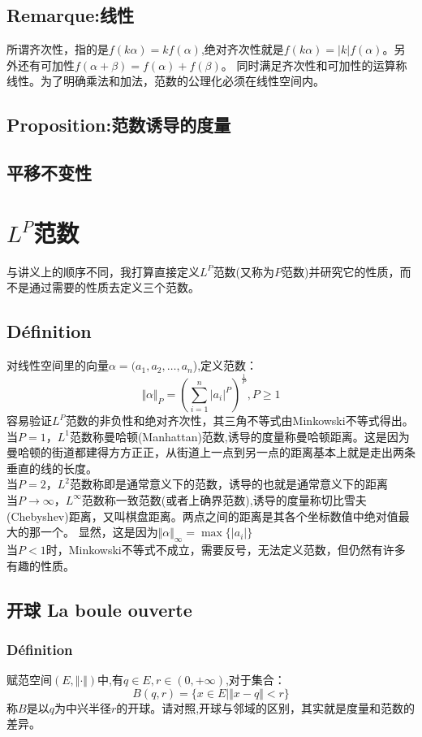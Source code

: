 \documentclass[12pt, a4paper, oneside]{ctexbook}
\begin{document}
  \subsection{Remarque:线性}
  所谓齐次性，指的是$f(k\alpha)=kf(\alpha)$,绝对齐次性就是$f(k\alpha)= | k | f(\alpha)$。另外还有可加性$f(\alpha+\beta)=f(\alpha)+f(\beta)$。
  同时满足齐次性和可加性的运算称线性。为了明确乘法和加法，范数的公理化必须在线性空间内。
  \subsection{Proposition:范数诱导的度量}
  \subsection{平移不变性}


\section{$L^P$范数}
与讲义上的顺序不同，我打算直接定义$L^P$范数(又称为$P$范数)并研究它的性质，而不是通过需要的性质去定义三个范数。
  \subsection{Définition}
  对线性空间里的向量$\alpha=(a_1,a_2,\dots,a_n$),定义范数：
  $$
    \Vert \alpha\Vert_P=(\sum_{i=1}^{n}|a_i|^P)^{\frac{1}{P}},P\ge1  
  $$
  容易验证$L^P$范数的非负性和绝对齐次性，其三角不等式由Minkowski不等式得出。\\
  当$P=1$，$L^1$范数称曼哈顿(Manhattan)范数,诱导的度量称曼哈顿距离。这是因为曼哈顿的街道都建得方方正正，从街道上一点到另一点的距离基本上就是走出两条垂直的线的长度。\\
  当$P=2$，$L^2$范数称即是通常意义下的范数，诱导的也就是通常意义下的距离\\
  当$P\rightarrow \infty$，$L^\infty$范数称一致范数(或者上确界范数),诱导的度量称切比雪夫(Chebyshev)距离，又叫棋盘距离。两点之间的距离是其各个坐标数值中绝对值最大的那一个。
  显然，这是因为$\Vert \alpha\Vert_\infty=\max\{|a_i|\}$\\
  当$P<1$时，Minkowski不等式不成立，需要反号，无法定义范数，但仍然有许多有趣的性质。
  \subsection{开球 La boule ouverte}
  \subsubsection{Définition}
  赋范空间$(E,\Vert \cdot \Vert)$中,有$q\in E,r\in(0,+\infty)$,对于集合：
  $$
    B(q,r)=\{x\in E |\Vert x-q \Vert<r \}
  $$
  称$B$是以$q$为中兴半径$r$的开球。请对照,开球与邻域的区别，其实就是度量和范数的差异。
\end{document}
